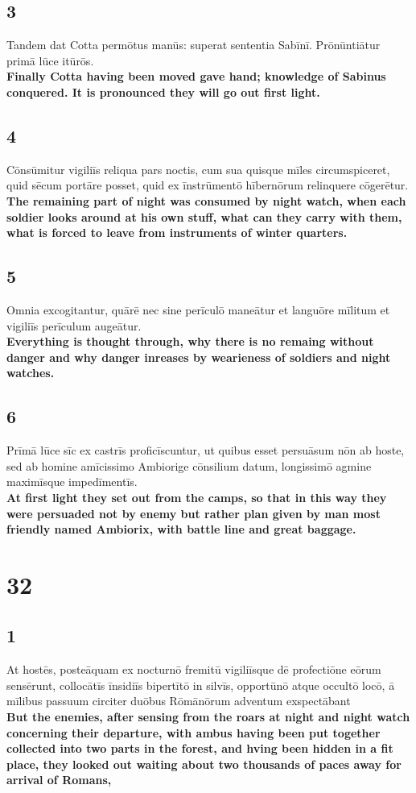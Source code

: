 \documentclass{article}
\begin{document}
\subsection*{3}
Tandem dat Cotta permōtus manūs: superat sententia Sabīnī. Prōnūntiātur primā lūce itūrōs. \\
\textbf{Finally Cotta having been moved gave hand; knowledge of Sabinus conquered. It is pronounced they will go out first light.}

\subsection*{4}
Cōnsūmitur vigiliīs reliqua pars noctis, cum sua quisque mīles circumspiceret, quid sēcum portāre posset, quid ex īnstrūmentō hībernōrum relinquere cōgerētur. \\
\textbf{The remaining part of night was consumed by night watch, when each soldier looks around at his own stuff, what can they carry with them, what is forced to leave from instruments of winter quarters. }


\subsection*{5}
Omnia excogitantur, quārē nec sine perīculō maneātur et languōre mīlitum et vigiliīs perīculum augeātur. \\
\textbf{Everything is thought through, why there is no remaing without danger and why danger inreases by wearieness of soldiers and night watches.}

\subsection*{6}
Prīmā lūce sīc ex castrīs proficīscuntur, ut quibus esset persuāsum nōn ab hoste, sed ab homine amīcissimo Ambiorige cōnsilium datum, longissimō agmine maximīsque impedīmentīs.\\
\textbf{At first light they set out from the camps, so that in this way they were persuaded not by enemy but rather plan given by man most friendly named Ambiorix, with battle line and great baggage.}

\section*{32}

\subsection*{1}
At hostēs, posteāquam ex nocturnō fremitū vigiliīsque dē profectiōne eōrum sensērunt, collocātīs īnsidiīs bipertītō in silvīs, opportūnō atque occultō locō, ā mīlibus passuum circiter duōbus Rōmānōrum adventum exspectābant \\
\textbf{But the enemies, after sensing from the roars at night and night watch concerning their departure, with ambus having been put together collected into two parts in the forest, and hving been hidden in a fit place, they looked out waiting about two thousands of paces away for arrival of Romans,}
\end{document}

